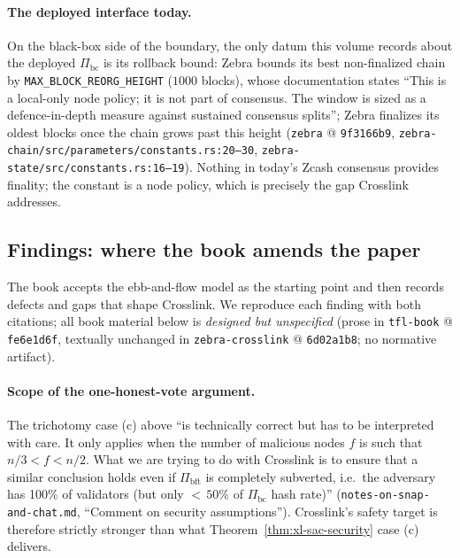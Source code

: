 \documentclass[11pt,a4paper]{article}
\theoremstyle{definition}
\begin{document}
\paragraph{The deployed interface today.} On the black-box side of the
boundary, the only datum this volume records about the deployed
$\Pi_{\mathrm{bc}}$ is its rollback bound: Zebra bounds its best
non-finalized chain by \texttt{MAX\_BLOCK\_REORG\_HEIGHT} ($1000$ blocks),
whose documentation states ``This is a local-only node policy; it is not
part of consensus. The window is sized as a defence-in-depth measure
against sustained consensus splits''; Zebra finalizes its oldest blocks
once the chain grows past this height (\texttt{zebra} @ \texttt{9f3166b9},
\texttt{zebra-chain/src/parameters/constants.rs:20--30},
\texttt{zebra-state/src/constants.rs:16--19}). Nothing in today's Zcash
consensus provides finality; the constant is a node policy, which is
precisely the gap Crosslink addresses.

\subsection{Findings: where the book amends the paper}
\label{sec:xl-book-findings}

The book accepts the ebb-and-flow model as the starting point and then
records defects and gaps that shape Crosslink. We reproduce each finding
with both citations; all book material below is \emph{designed but
unspecified} (prose in \texttt{tfl-book} @ \texttt{fe6e1d6f}, textually
unchanged in \texttt{zebra-crosslink} @ \texttt{6d02a1b8}; no normative
artifact).

\paragraph{Scope of the one-honest-vote argument.} The trichotomy case (c)
above ``is technically correct but has to be interpreted with care. It
only applies when the number of malicious nodes $f$ is such that
$n/3 < f < n/2$. What we are trying to do with Crosslink is to ensure that
a similar conclusion holds even if $\Pi_{\mathrm{bft}}$ is completely
subverted, i.e.\ the adversary has 100\% of validators (but only
${<}\,50\%$ of $\Pi_{\mathrm{bc}}$ hash rate)''
(\texttt{notes-on-snap-and-chat.md}, ``Comment on security
assumptions''). Crosslink's safety target is therefore strictly stronger
than what Theorem~\ref{thm:xl-sac-security} case (c) delivers.
\end{document}
